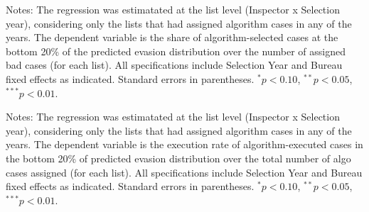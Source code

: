 \documentclass{article}
\newcommand{\OutPath}{Output/}%
\newcommand{\OutPath}{../Output/}%
\begin{document}
\begin{landscape}
\begin{table}[H]
\begin{threeparttable}
\begin{tablenotes}[flushleft]
\footnotesize
\item Notes: The regression was estimatated at the list level (Inspector x Selection year), considering only the lists that had assigned algorithm cases in any of the years. The dependent variable is the share of algorithm-selected
cases at the bottom 20\% of the predicted evasion distribution over the number of assigned bad cases (for each list). All specifications include Selection Year and Bureau fixed effects as indicated. Standard errors in parentheses. 
$^{*}p<0.10$, $^{**}p<0.05$, $^{***}p<0.01$.
\end{tablenotes}
\end{threeparttable}
\end{table}

    

\begin{table}[H]\centering
\begin{threeparttable}
\caption{Share of High potential case vrs Executed bottom-20\% assigned (all)  [Desk audits]}
\label{tab:inspector_effort_share_Desk}
\footnotesize


\begin{tablenotes}[flushleft]
\footnotesize
\item Notes: The regression was estimatated at the list level (Inspector x Selection year), considering only the lists that had assigned algorithm cases in any of the years.  The dependent variable is the execution rate of algorithm-executed cases in the bottom 20\% of predicted evasion distribution over the total number of algo cases assigned (for each list). All specifications include Selection Year and Bureau fixed effects as indicated. Standard errors in parentheses. 
$^{*}p<0.10$, $^{**}p<0.05$, $^{***}p<0.01$.
\end{tablenotes}
\end{threeparttable}
\end{table}




\end{landscape}
\end{document}
